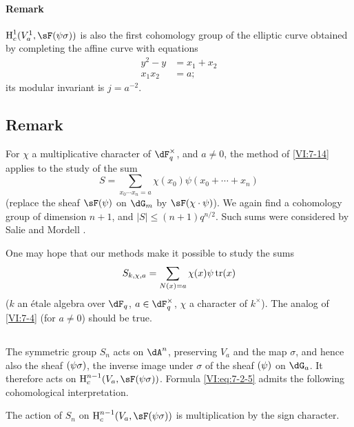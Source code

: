\paragraph{Remark}

$\h_c^1(V_a^1,\sF(\psi\sigma))$ is also the first cohomology group of 
the elliptic curve obtained by completing the affine curve with equations 
\begin{align*}
  y^2-y &= x_1+x_2 \\
  x_1 x_2 &= a \text{;} 
\end{align*}
its modular invariant is $j=a^{-2}$. 





\subsection{Remark}\label{VI:7-18}

For $\chi$ a multiplicative character of $\dF_q^\times$, and $a\ne 0$, the 
method of \ref{VI:7-14} applies to the study of the sum 
\[
  S = \sum_{x_0\dotsm x_n = a} \chi(x_0) \psi(x_0+\cdots + x_n) 
\]
(replace the sheaf $\sF(\psi)$ on $\dG_m$ by $\sF(\chi\cdot \psi)$). We 
again find a cohomology group of dimension $n+1$, and 
$|S|\leqslant (n+1)q^{n/2}$. Such sums were considered by 
Salie and Mordell \cite{mo73}.

One may hope that our methods make it possible to study the sums 
\[
  S_{k,\chi,a} = \sum_{N(x)=a} \chi(x) \psi \operatorname{tr}(x) 
\]
($k$ an étale algebra over $\dF_q$, $a\in \dF_q^\times$, $\chi$ a character of 
$k^\times$). The analog of \ref{VI:7-4} (for $a\ne 0$) should be true. 





\subsection{}\label{VI:7-19}

The symmetric group $S_n$ acts on $\dA^n$, preserving $V_a$ and 
the map $\sigma$, and hence also the sheaf $\sf(\psi\sigma)$, the inverse 
image under $\sigma$ of the sheaf $\sf(\psi)$ on $\dG_a$. It therefore acts 
on $\h_c^{n-1}(V_a,\sF(\psi\sigma))$. Formula \eqref{VI:eq:7-2-5} admits 
the following cohomological interpretation.





\begin{proposition_}\label{VI:7-20}
The action of $S_n$ on $\h_c^{n-1}(V_a,\sF(\psi\sigma))$ is multiplication 
by the sign character. 
\end{proposition_}

